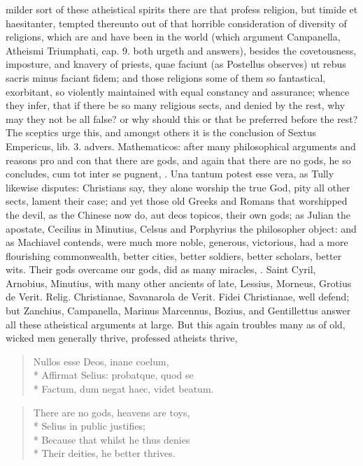 {milder sort of these atheistical spirits there are that profess
religion, but timide et haesitanter, tempted thereunto out of that
horrible consideration of diversity of religions, which are and have
been in the world (which argument Campanella, Atheismi Triumphati, cap.
9. both urgeth and answers), besides the covetousness, imposture, and
knavery of priests, quae faciunt (as Postellus observes) ut rebus
sacris minus faciant fidem; and those religions some of them so
fantastical, exorbitant, so violently maintained with equal constancy
and assurance; whence they infer, that if there be so many religious
sects, and denied by the rest, why may they not be all false? or why
should this or that be preferred before the rest? The sceptics urge
this, and amongst others it is the conclusion of Sextus Empericus, lib.
3. advers. Mathematicos: after many philosophical arguments and reasons
pro and con that there are gods, and again that there are no gods, he
so concludes, cum tot inter se pugnent, \etc{}. Una tantum potest esse
vera, as Tully likewise disputes: Christians say, they alone worship
the true God, pity all other sects, lament their case; and yet those
old Greeks and Romans that worshipped the devil, as the Chinese now do,
aut deos topicos, their own gods; as Julian the apostate,
Cecilius in Minutius, Celsus and Porphyrius the philosopher
object: and as Machiavel contends, were much more noble, generous,
victorious, had a more flourishing commonwealth, better cities, better
soldiers, better scholars, better wits. Their gods overcame our gods,
did as many miracles, \etc{}. Saint Cyril, Arnobius, Minutius, with many
other ancients of late, Lessius, Morneus, Grotius de Verit. Relig.
Christianae, Savanarola de Verit. Fidei Christianae, well defend; but
Zanchius, Campanella, Marinus Marcennus, Bozius, and Gentillettus
answer all these atheistical arguments at large. But this again
troubles many as of old, wicked men generally thrive, professed
atheists thrive,

\begin{latin}
\begin{verse}
Nullos esse Deos, inane coelum,\\*
Affirmat Selius: probatque, quod se\\*
Factum, dum negat haec, videt beatum.
\end{verse}
\end{latin}

\begin{verse}
There are no gods, heavens are toys,\\*
Selius in public justifies;\\*
Because that whilst he thus denies\\*
Their deities, he better thrives.
\end{verse}

}
